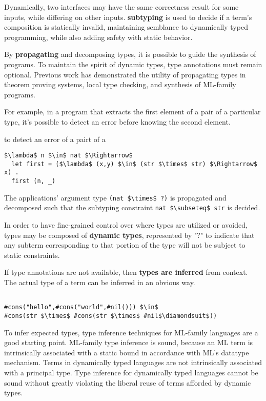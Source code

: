 \documentclass[sigplan,screen]{acmart}
\begin{document}
Dynamically, two interfaces may have the same correctness result for some inputs,
while differing on other inputs. \textbf{subtyping} is used to decide if a term's 
composition is statically invalid, maintaining semblance to dynamically typed programming,
while also adding safety with static behavior.

By \textbf{propagating} and decomposing types, 
it is possible to guide the synthesis of programs.
To maintain the spirit of dynamic types, type annotations must remain optional.
Previous work has demonstrated the utility of propagating types 
in theorem proving systems, local type checking, 
and synthesis of ML-family programs.

For example, in a program that extracts 
the first element of a pair of a particular type, 
it's possible to detect an error before knowing the second element.

to detect an error of a pairt of a   
\begin{lstlisting}
$\lambda$ n $\in$ nat $\Rightarrow$
  let first = ($\lambda$ (x,y) $\in$ (str $\times$ str) $\Rightarrow$ x) .
  first (n, _) 
\end{lstlisting}

\noindent The  applications' argument type \lstinline{(nat $\times$ ?)} 
is propagated and decomposed such that the subtyping constraint 
\lstinline{nat $\subseteq$ str} is decided. 

In order to have fine-grained control over where types are utilized or avoided, 
types may be composed of \textbf{dynamic types}, represented by "?" to indicate 
that any subterm corresponding to that portion of the type 
will not be subject to static constraints.

If type annotations are not available, then \textbf{types are inferred} from context. 
The actual type of a term can be inferred in an obvious way.  

\begin{lstlisting}

#cons("hello",#cons("world",#nil())) $\in$ 
#cons(str $\times$ #cons(str $\times$ #nil$\diamondsuit$))

\end{lstlisting}

To infer expected types, type inference techniques for ML-family languages 
are a good starting point.
ML-family type inference is sound, because an ML term is 
intrinsically associated with a static bound in accordance with ML's datatype mechanism.
Terms in dynamically typed languages are not intrinsically associated with a principal type. 
Type inference for dynamically typed languages cannot be sound without greatly violating the 
liberal reuse of terms afforded by dynamic types. 
\end{document}
